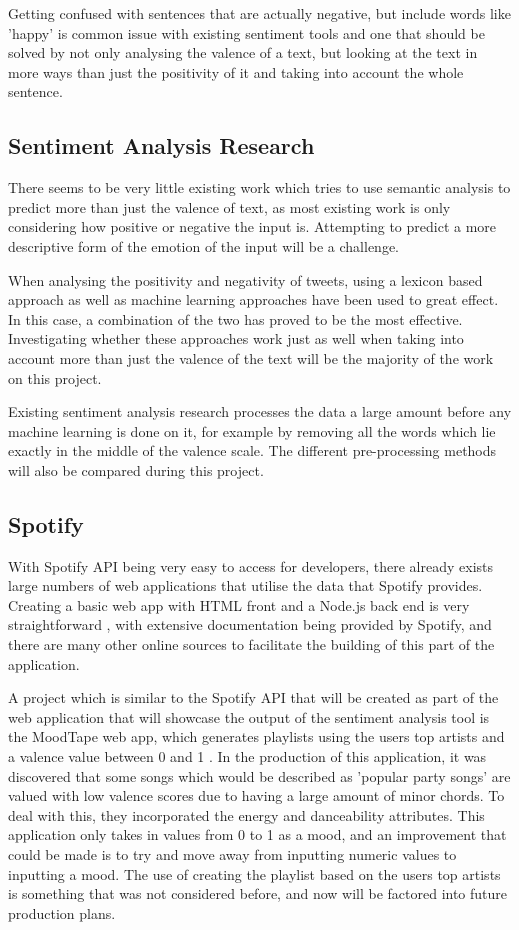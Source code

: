 Getting confused with sentences that are actually negative, but include words like 'happy' is common issue with existing sentiment tools and one that should be solved by not only analysing the valence of a text, but looking at the text in more ways than just the positivity of it and taking into account the whole sentence.

\subsection{Sentiment Analysis Research}

There seems to be very little existing work which tries to use semantic analysis to predict more than just the valence of text, as most existing work is only considering how positive or negative the input is. Attempting to predict a more descriptive form of the emotion of the input will be a challenge.

When analysing the positivity and negativity of tweets, using a lexicon based approach as well as machine learning approaches have been used \cite{kolchyna2015twitter} \cite{go2009twitter} to great effect. In this case, a combination of the two has proved to be the most effective. Investigating whether these approaches work just as well when taking into account more than just the valence of the text will be the majority of the work on this project.

Existing sentiment analysis research processes the data a large amount before any machine learning is done on it, for example by removing all the words which lie exactly in the middle of the valence scale.  \cite{kolchyna2015twitter} The different pre-processing methods will also be compared during this project.

\subsection{Spotify}
With Spotify API being very easy to access for developers, there already exists large numbers of web applications that utilise the data that Spotify provides. Creating a basic web app with HTML front and a Node.js back end is very straightforward \cite{spotifyHello}, with extensive documentation being provided by Spotify, and there are many other online sources to facilitate the building of this part of the application. 

A project which is similar to the Spotify API that will be created as part of the web application that will showcase the output of the sentiment analysis tool is the MoodTape web app, which generates playlists using the users top artists and a valence value between 0 and 1 \cite{moodtape}.
In the production of this application, it was discovered that some songs which would be described as 'popular party songs' are valued with low valence scores due to having a large amount of minor chords. To deal with this, they incorporated the energy and danceability attributes. 
This application only takes in values from 0 to 1 as a mood, and an improvement that could be made is to try and move away from inputting numeric values to inputting a mood. The use of creating the playlist based on the users top artists is something that was not considered before, and now will be factored into future production plans.

